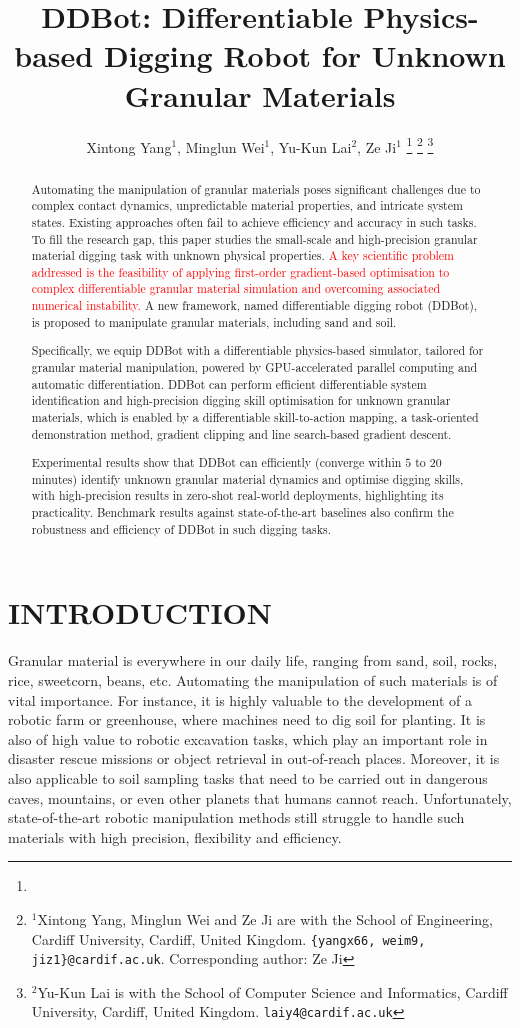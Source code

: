 \documentclass[letterpaper, 10 pt, journal, twoside]{ieeetran}
\title{\LARGE \bf
DDBot: Differentiable Physics-based Digging Robot for Unknown Granular Materials
}
\author{Xintong Yang$^{1}$, Minglun Wei$^{1}$, Yu-Kun Lai$^{2}$, Ze Ji$^{1}$%
\thanks{}%
\thanks{$^{1}$Xintong Yang, Minglun Wei and Ze Ji are with the School of Engineering, Cardiff University, Cardiff, United Kingdom. {\tt\small \{yangx66, weim9, jiz1\}@cardif.ac.uk}. Corresponding author: Ze Ji}%
\thanks{$^{2}$Yu-Kun Lai is with the School of Computer Science and Informatics, Cardiff University, Cardiff, United Kingdom. {\tt\small laiy4@cardif.ac.uk}}%
}
\newcommand{\rps}[1]{\textcolor{red}{#1}}
\begin{document}
\maketitle
\thispagestyle{empty}
\pagestyle{empty}


\begin{abstract}
Automating the manipulation of granular materials poses significant challenges due to complex contact dynamics, unpredictable material properties, and intricate system states. Existing approaches often fail to achieve efficiency and accuracy in such tasks. To fill the research gap, this paper studies the small-scale and high-precision granular material digging task with unknown physical properties. \rps{A key scientific problem addressed is the feasibility of applying first-order gradient-based optimisation to complex differentiable granular material simulation and overcoming associated numerical instability.} A new framework, named differentiable digging robot (DDBot), is proposed to manipulate granular materials, including sand and soil.

Specifically, we equip DDBot with a differentiable physics-based simulator, tailored for granular material manipulation, powered by GPU-accelerated parallel computing and automatic differentiation. DDBot can perform efficient differentiable system identification and high-precision digging skill optimisation for unknown granular materials, which is enabled by a differentiable skill-to-action mapping, a task-oriented demonstration method, gradient clipping and line search-based gradient descent.

Experimental results show that DDBot can efficiently (converge within $5$ to $20$ minutes) identify unknown granular material dynamics and optimise digging skills, with high-precision results in zero-shot real-world deployments, highlighting its practicality. Benchmark results against state-of-the-art baselines also confirm the robustness and efficiency of DDBot in such digging tasks.
\end{abstract}

\section{INTRODUCTION} \label{sec:intro}
Granular material is everywhere in our daily life, ranging from sand, soil, rocks, rice, sweetcorn, beans, etc. Automating the manipulation of such materials is of vital importance. For instance, it is highly valuable to the development of a robotic farm or greenhouse, where machines need to dig soil for planting. It is also of high value to robotic excavation tasks, which play an important role in disaster rescue missions or object retrieval in out-of-reach places. Moreover, it is also applicable to soil sampling tasks that need to be carried out in dangerous caves, mountains, or even other planets that humans cannot reach. Unfortunately, state-of-the-art robotic manipulation methods still struggle to handle such materials with high precision, flexibility and efficiency.
\end{document}
